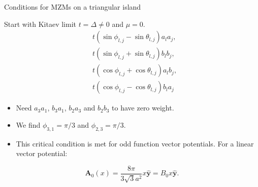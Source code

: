 \documentclass[xcolor=dvipsnames,10pt,aspectratio=169]{beamer}
\let\oldhat\hat
\renewcommand{\hat}[1]{\oldhat{\mathbf{#1}}}
\renewcommand{\vec}[1]{\mathbf{#1}}
\newcommand{\de}{\Delta}
\begin{document}
  \begin{frame}{Conditions for MZMs on a triangular island}
    \begin{minipage}{\textwidth}
    \begin{multicols}{2}
    Start with Kitaev limit $t = \de \neq 0$ and $\mu=0$.
    \begin{align}
      &t (\sin\phi_{l,j} - \sin\theta_{l,j}) a_l a_j, \\
      &t (\sin\phi_{l,j} + \sin\theta_{l,j}) b_l b_j, \\
      &t (\cos\phi_{l,j} + \cos\theta_{l,j}) a_l b_j, \\
      &t (\cos\phi_{l,j} - \cos\theta_{l,j}) b_l a_j
    \end{align}
    \centering
    \end{multicols}
    \vspace{2pt}
    \end{minipage}
    \begin{itemize}
      \item Need $a_3 a_1$, $b_3 a_1$, $b_2 a_3$ and $b_2 b_3$ to have zero weight. \\
      \item We find $\phi_{3,1} = \pi/3$ and $\phi_{2,3}=\pi/3$. \\
      \item This critical condition is met for odd function vector potentials. For a linear vector potential:
    \end{itemize}
    \begin{equation}
      \vec{A}_0(x) = \dfrac{8\pi}{3\sqrt{3}a^2} x \hat{y} = B_0 x \hat{y}.
    \end{equation}
  \end{frame}
\end{document}
